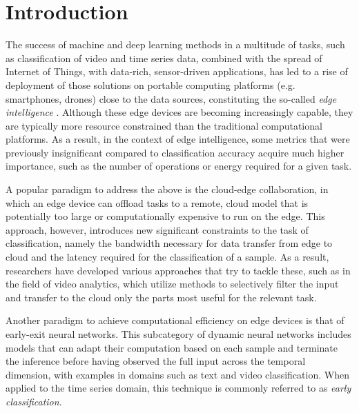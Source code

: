 \documentclass[conference]{IEEEtran}
\begin{document}
\section{Introduction}

The success of machine and deep learning methods in a multitude of tasks, such as classification of video and time series data, combined with the spread of Internet of Things, with data-rich, sensor-driven applications, has led to a rise of deployment of those solutions on portable computing platforms (e.g. smartphones, drones) close to the data sources, constituting the so-called \textit{edge intelligence} \cite{chenDeepLearningEdge2019,zhouEdgeIntelligencePaving2019}. Although these edge devices are becoming increasingly capable, they are typically more resource constrained than the traditional computational platforms. As a result, in the context of edge intelligence, some metrics that were previously insignificant compared to classification accuracy acquire much higher importance, such as the number of operations or energy required for a given task\cite{chenDeepLearningEdge2019}. 

A popular paradigm to address the above is the cloud-edge collaboration\cite{wangConvergenceEdgeComputing2020}, in which an edge device can offload tasks to a remote, cloud model that is potentially too large or computationally expensive to run on the edge. This approach, however, introduces new significant constraints to the task of classification, namely the bandwidth necessary for data transfer from edge to cloud and the latency required for the classification of a sample. As a result, researchers have developed various approaches that try to tackle these, such as \cite{canel2019fforward,wang2018bandwidth,nigade2020clownfish} in the field of video analytics, which utilize methods to selectively filter the input and transfer to the cloud only the parts most useful for the relevant task. 

Another paradigm to achieve computational efficiency on edge devices is that of early-exit neural networks\cite{han2021dynamic}. This subcategory of dynamic neural networks includes models that can adapt their computation based on each sample and terminate the inference before having observed the full input across the temporal dimension, with examples in domains such as text\cite{zhengjie2017textee} and video classification\cite{fan2018videoee}. When applied to the time series domain, this technique is commonly referred to as \textit{early classification}.
\end{document}

